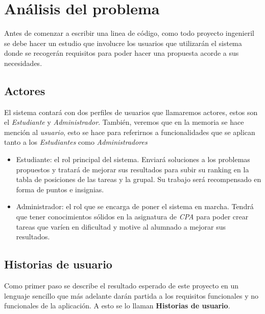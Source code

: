 \documentclass[11pt,spanish,listoffigures,listoftables]{tfgetsinf}
\begin{document}
\chapter{Análisis del problema}

Antes de comenzar a escribir una linea de código, como todo proyecto ingenieril se debe hacer un estudio que involucre los usuarios que utilizarán el sistema donde se recogerán requisitos para poder hacer una propuesta acorde a sus necesidades.

\section{Actores}

El sistema contará con dos perfiles de usuarios que llamaremos actores, estos son el \textit{Estudiante} y \textit{Administrador}. También, veremos que en la memoria se hace mención al \textit{usuario}, esto se hace para referirnos a funcionalidades que se aplican tanto a los \textit{Estudiantes} como \textit{Administradores}

\begin{itemize}
	\item Estudiante: el rol principal del sistema. Enviará soluciones a los problemas propuestos y tratará de mejorar sus resultados para subir su ranking en la tabla de posiciones de las tareas y la grupal. Su trabajo será recompensado en forma de puntos e insignias.
	\item Administrador: el rol que se encarga de poner el sistema en marcha. Tendrá que tener conocimientos sólidos en la asignatura de \textit{CPA} para poder crear tareas que varíen en dificultad y motive al alumnado a mejorar sus resultados.
\end{itemize}


\section{Historias de usuario}

Como primer paso se describe el resultado esperado de este proyecto en un lenguaje sencillo que más adelante darán partida a los requisitos funcionales y no funcionales de la aplicación. A esto se lo llaman \textbf{Historias de usuario}.
\end{document}
